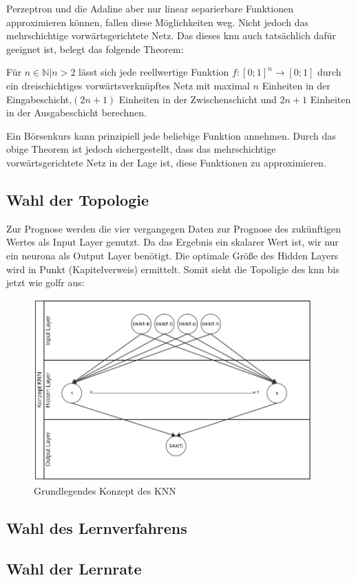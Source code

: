  Perzeptron und die Adaline aber nur linear separierbare Funktionen approximieren können, fallen diese Möglichkeiten weg. Nicht jedoch das mehrschichtige vorwärtsgerichtete Netz. Das dieses \ac{knn} auch tatsächlich dafür geeignet ist, belegt das folgende Theorem:



\begin{theo}
Für ${n \in \mathbb{N} | n>2}$ lässt sich jede reellwertige Funktion $f:[0;1]^n\rightarrow[0;1]$ durch ein dreischichtiges vorwärtsverknüpftes Netz mit maximal $n$ Einheiten in der Eingabeschicht,$(2n+1)$ Einheiten in der Zwischenschicht und $2n+1$ Einheiten in der Ausgabeschicht berechnen.
\end{theo}

Ein Börsenkurs kann prinzipiell jede beliebige Funktion annehmen. Durch das obige Theorem ist jedoch sichergestellt, dass das mehrschichtige vorwärtsgerichtete Netz in der Lage ist, diese Funktionen zu approximieren.


\subsection{Wahl der Topologie}
\label{subsection:Wahl der Topologie}

Zur Prognose werden die vier vergangegen Daten zur Prognose des zukünftigen Wertes als Input Layer genutzt. Da das Ergebnis ein skalarer Wert ist, wir nur ein neurona als Output Layer benötigt. Die optimale Größe des Hidden Layers wird in Punkt (Kapitelverweis) ermittelt. Somit sieht die Topoligie des knn bis jetzt wie golfr aus:

\begin{figure}
\centering
		\includegraphics[width=0.95\textwidth]{KonzeptKNN.PNG}
	\caption{Grundlegendes Konzept des KNN}
	\label{fig:Grundlegendes Konzept des KNN}
\end{figure}

\subsection{Wahl des Lernverfahrens} 
\label{subsection:Wahl des Lernverfahrens} 

\subsection{Wahl der Lernrate} 
\label{subsection:Wahl der Lernrate}

